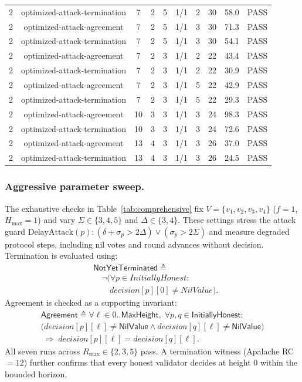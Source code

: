 \documentclass[conference,letterpaper,10pt]{IEEEtran}
\begin{document}
\begin{table}[!t]
{\begin{tabular}{lccrrrrrrc}
2  & optimized-attack-termination      &  7 & 2 & 5 & 1/1 & 2 & 30 & 58.0 & PASS \\
2  & optimized-attack-agreement        &  7 & 2 & 5 & 1/1 & 3 & 30 & 71.3 & PASS \\
2  & optimized-attack-termination      &  7 & 2 & 5 & 1/1 & 3 & 30 & 54.1 & PASS \\
2  & optimized-attack-agreement        &  7 & 2 & 3 & 1/1 & 2 & 22 & 43.4 & PASS \\
2  & optimized-attack-termination      &  7 & 2 & 3 & 1/1 & 2 & 22 & 30.9 & PASS \\
2  & optimized-attack-agreement        &  7 & 2 & 3 & 1/1 & 5 & 22 & 42.9 & PASS \\
2  & optimized-attack-termination      &  7 & 2 & 3 & 1/1 & 5 & 22 & 29.3 & PASS \\
2  & optimized-attack-agreement        & 10 & 3 & 3 & 1/1 & 3 & 24 & 98.3 & PASS \\
2  & optimized-attack-termination      & 10 & 3 & 3 & 1/1 & 3 & 24 & 72.6 & PASS \\
2  & optimized-attack-agreement        & 13 & 4 & 3 & 1/1 & 3 & 26 & 37.0 & PASS \\
2  & optimized-attack-termination      & 13 & 4 & 3 & 1/1 & 3 & 26 & 24.5 & PASS \\
\bottomrule
\end{tabular}
}
\end{table}
\subsubsection{Aggressive parameter sweep.}

The exhaustive checks in Table~\ref{tab:comprehensive} fix $V=\{v_1,v_2,v_3,v_4\}$ ($f=1$, $H_{\max}=1$) and vary $\Sigma\in\{3,4,5\}$ and $\Delta\in\{3,4\}$. These settings stress the attack guard $\mathrm{DelayAttack}(p): (\delta+\sigma_p>2\Delta)\vee(\sigma_p>2\Sigma)$ and measure degraded protocol steps, including nil votes and round advances without decision. Termination is evaluated using:
\[
\begin{aligned}
 &\mathsf{NotYetTerminated} \triangleq{}\\
 &\quad\lnot\big(\forall p\in InitiallyHonest:\\
 &\qquad decision[p][0]\neq NilValue\big).
\end{aligned}
\]
Agreement is checked as a supporting invariant:
\begin{multline*}
\mathsf{Agreement} \triangleq \forall \ell\in 0..\mathsf{MaxHeight},\;
\forall p,q\in \mathsf{InitiallyHonest}:\\
\bigl(decision[p][\ell]\neq \mathsf{NilValue} \land
decision[q][\ell]\neq \mathsf{NilValue}\bigr)\\
\;\Rightarrow\; decision[p][\ell]=decision[q][\ell].
\end{multline*}
All seven runs across $R_{\max}\in\{2,3,5\}$ pass. A termination witness (Apalache RC$=12$) further confirms that every honest validator decides at height $0$ within the bounded horizon.
\end{document}

